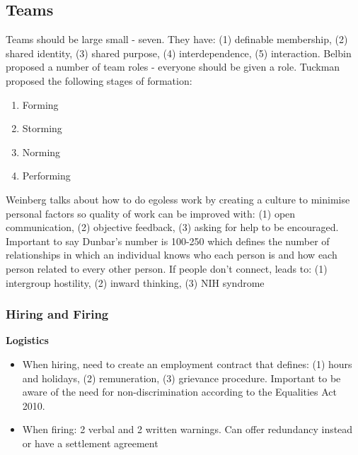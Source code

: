 \documentclass{article}
\begin{document}
\begin{multicols}{2}
\subsection{Teams}
Teams should be large small - seven. They have: (1) definable membership, (2) shared identity, (3) shared purpose, (4) interdependence, (5) interaction. Belbin proposed a number of team roles - everyone should be given a role. Tuckman proposed the following stages of formation:
\begin{enumerate}
    \item Forming
    \item Storming
    \item Norming
    \item Performing
\end{enumerate}

Weinberg talks about how to do egoless work by creating a culture to minimise personal factors so quality of work can be improved with: (1) open communication, (2) objective feedback, (3) asking for help to be encouraged. Important to say Dunbar's number is 100-250 which defines the number of relationships in which an individual knows who each person is and how each person related to every other person. If people don't connect, leads to: (1) intergroup hostility, (2) inward thinking, (3) NIH syndrome

\subsubsection{Hiring and Firing}
\textbf{Logistics}
\begin{itemize}
    \item When hiring, need to create an employment contract that defines: (1) hours and holidays, (2) remuneration, (3) grievance procedure. Important to be aware of the need for non-discrimination according to the Equalities Act 2010.
    \item When firing: 2 verbal and 2 written warnings. Can offer redundancy instead or have a settlement agreement
\end{itemize}


\end{multicols}
\end{document}

